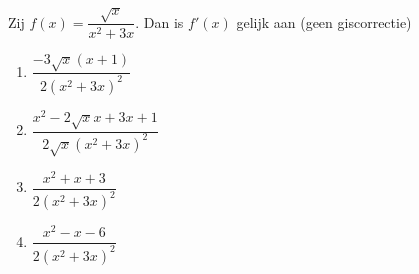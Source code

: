 \documentclass[12pt]{article}
\begin{document}
Zij $f(x)=\dfrac{\sqrt{x}}{x^2+3x}$. Dan is $f'(x)$ gelijk aan \hfill(geen giscorrectie)
\begin{enumerate}[\hspace{0.5cm}(A)]
  \itemsep.5em
  \item $\dfrac{-3\sqrt{x}(x+1)}{2(x^2+3x)^2}$
  \item $\dfrac{x^2-2\sqrt{x}x + 3x + 1}{2\sqrt{x}(x^2+3x)^2}$
  \item $\dfrac{x^2+x+3}{2(x^2+3x)^2}$
  \item $\dfrac{x^2-x-6}{2(x^2+3x)^2}$
\end{enumerate}
\end{document}
